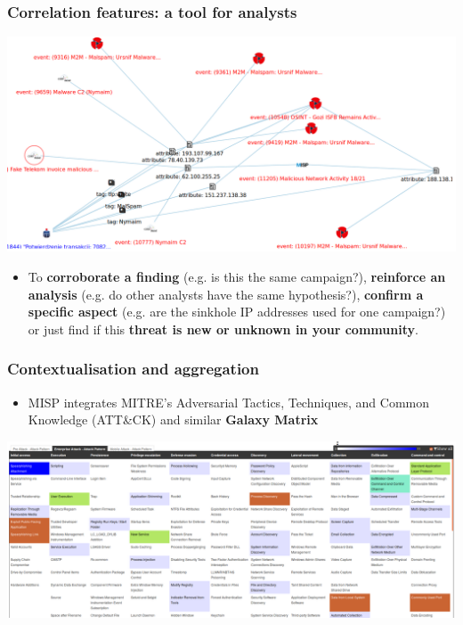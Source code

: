 \begin{frame}
        \frametitle{Correlation features: a tool for analysts}
        \begin{center}
            \includegraphics[scale=0.18]{screenshots/campaign.png}
        \end{center}
        \begin{itemize}
                \item To {\bf corroborate a finding} (e.g. is this the same campaign?), {\bf reinforce an analysis} (e.g. do other analysts have the same hypothesis?), {\bf confirm a specific aspect} (e.g. are the sinkhole IP addresses used for one campaign?) or just find if this {\bf threat is new or unknown in your community}.
        \end{itemize}
\end{frame}

\begin{frame}
        \frametitle{Contextualisation and aggregation}
        \begin{itemize}
                \item MISP integrates MITRE's Adversarial Tactics, Techniques, and Common Knowledge (ATT\&CK) and similar {\bf Galaxy Matrix}
        \end{itemize}
        \includegraphics[scale=0.2]{screenshots/attack-screenshot.png}
\end{frame}

